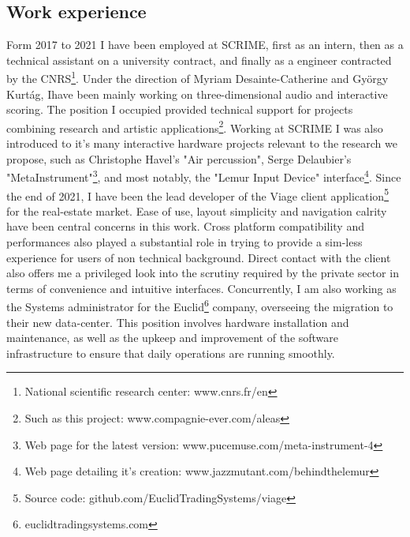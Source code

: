 \documentclass[journal,onecolumn]{IEEEtran}
\begin{document}
\subsection{Work experience} %
Form 2017 to 2021 I have been employed at SCRIME, first as an intern, then as a technical assistant on a university contract, and finally as a engineer contracted by the CNRS\footnote{National scientific research center: www.cnrs.fr/en}. Under the direction of Myriam Desainte-Catherine and György Kurtág, Ihave been mainly working on three-dimensional audio and interactive scoring. The position I occupied provided technical support for projects combining research and artistic applications\footnote{Such as this project: www.compagnie-ever.com/aleas}. Working at SCRIME I was also introduced to it's many interactive hardware projects relevant to the research we propose, such as Christophe Havel's "Air percussion"\cite{havel:air}, Serge Delaubier's "MetaInstrument"\footnote{Web page for the latest version: www.pucemuse.com/meta-instrument-4}, and most notably, the "Lemur Input Device" interface\footnote{Web page detailing it's creation: www.jazzmutant.com/behindthelemur}.
Since the end of 2021, I have been the lead developer of the Viage client application\footnote{Source code: github.com/EuclidTradingSystems/viage} for the real-estate market. Ease of use, layout simplicity and navigation calrity have been central concerns in this work. Cross platform compatibility and performances also played a substantial role in trying to provide a sim-less experience for users of non technical background. Direct contact with the client also offers me a privileged look into the scrutiny required by the private sector in terms of convenience and intuitive interfaces. Concurrently, I am also working as the Systems administrator for the Euclid\footnote{euclidtradingsystems.com} company, overseeing the migration to their new data-center. This position involves hardware installation and maintenance, as well as the upkeep and improvement of the software infrastructure to ensure that daily operations are running smoothly. 
\end{document}
